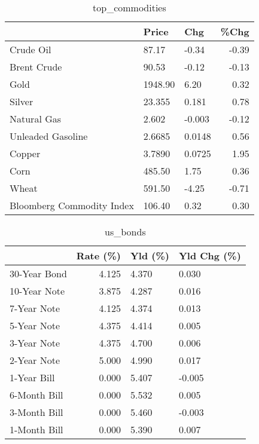 \documentclass{article}%
\begin{document}
\begin{table}[htbp]%
\caption{top\_commodities}%
\centering%
\begin{adjustbox}{width=1\textwidth}%
\begin{tabular}{lllr}
\toprule
                          &   Price &    Chg &  \%Chg \\
\midrule
               Crude Oil  &   87.17 &  -0.34 & -0.39 \\
             Brent Crude  &   90.53 &  -0.12 & -0.13 \\
                    Gold  & 1948.90 &   6.20 &  0.32 \\
                  Silver  &  23.355 &  0.181 &  0.78 \\
             Natural Gas  &   2.602 & -0.003 & -0.12 \\
       Unleaded Gasoline  &  2.6685 & 0.0148 &  0.56 \\
                  Copper  &  3.7890 & 0.0725 &  1.95 \\
                    Corn  &  485.50 &   1.75 &  0.36 \\
                   Wheat  &  591.50 &  -4.25 & -0.71 \\
Bloomberg Commodity Index &  106.40 &   0.32 &  0.30 \\
\bottomrule
\end{tabular}
%
\end{adjustbox}%
\end{table}

%


\begin{table}[htbp]%
\caption{us\_bonds}%
\centering%
\begin{adjustbox}{width=1\textwidth}%
\begin{tabular}{lrll}
\toprule
             &  Rate (\%) & Yld (\%) & Yld Chg (\%) \\
\midrule
30-Year Bond &     4.125 &   4.370 &       0.030 \\
10-Year Note &     3.875 &   4.287 &       0.016 \\
 7-Year Note &     4.125 &   4.374 &       0.013 \\
 5-Year Note &     4.375 &   4.414 &       0.005 \\
 3-Year Note &     4.375 &   4.700 &       0.006 \\
 2-Year Note &     5.000 &   4.990 &       0.017 \\
 1-Year Bill &     0.000 &   5.407 &      -0.005 \\
6-Month Bill &     0.000 &   5.532 &       0.005 \\
3-Month Bill &     0.000 &   5.460 &      -0.003 \\
1-Month Bill &     0.000 &   5.390 &       0.007 \\
\bottomrule
\end{tabular}
%
\end{adjustbox}%
\end{table}
\end{document}
